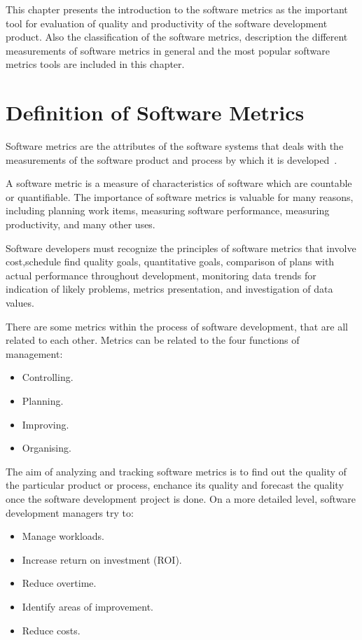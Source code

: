 This chapter presents the introduction to the software metrics as the important tool for evaluation of quality and productivity of the software development product. Also the classification of the software metrics, description the different measurements of software metrics in general and the most popular software metrics tools are included in this chapter.


\section{Definition of Software Metrics}

Software metrics are the attributes of the software systems that deals with the measurements of the software product and process by which it is developed~\cite{metrix}.
 
A software metric is a measure of characteristics of software which are countable or quantifiable. The importance of software metrics is valuable for many reasons, including planning work items, measuring software performance, measuring productivity, and many other uses.

Software developers must recognize the principles of software metrics that involve cost,schedule find quality goals, quantitative goals, comparison of plans with actual performance throughout development, monitoring data trends for indication of likely problems, metrics presentation, and investigation of data values.

There are some metrics within the process of software development, that are all related to each other. Metrics can be related to the four functions of management:

\begin{itemize}
	\item Controlling.
	\item Planning.
	\item Improving.
	\item Organising.
\end{itemize}

The aim of analyzing and tracking software metrics is to find out the quality of the particular product or process, enchance its quality and forecast the quality once the software development project is done. On a more detailed level, software development managers try to:

\begin{itemize}
	\item Manage workloads.
	\item Increase return on investment (ROI).
	\item Reduce overtime.
	\item Identify areas of improvement.
	\item Reduce costs.
\end{itemize}

